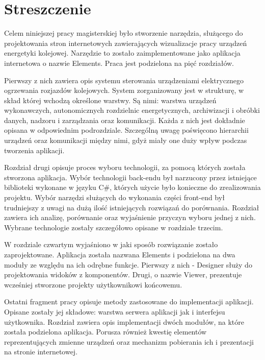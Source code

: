 \chapter*{Streszczenie}

Celem niniejszej pracy magisterskiej było stworzenie narzędzia, służącego do projektowania stron internetowych zawierających wizualizacje pracy urządzeń energetyki kolejowej. Narzędzie to zostało zaimplementowane jako aplikacja internetowa o nazwie Elements. Praca jest podzielona na pięć rozdziałów.

Pierwszy z nich zawiera opis systemu sterowania urządzeniami elektrycznego ogrzewania rozjazdów kolejowych. System zorganizowany jest w strukturę, w skład której wchodzą określone warstwy. Są nimi: warstwa urządzeń wykonawczych, autonomicznych rozdzielnic energetycznych, archiwizacji i obróbki danych, nadzoru i zarządzania oraz komunikacji. Każda z nich jest dokładnie opisana w odpowiednim podrozdziale. Szczególną uwagę poświęcono hierarchii urządzeń oraz komunikacji między nimi, gdyż miały one duży wpływ podczas tworzenia aplikacji.

Rozdział drugi opisuje proces wyboru technologii, za pomocą których została stworzona aplikacja. Wybór technologii back-endu był narzucony przez istniejące biblioteki wykonane w języku C\#, których użycie było konieczne do zrealizowania projektu. Wybór narzędzi służących do wykonania części front-end był trudniejszy z uwagi na dużą ilość istniejących rozwiązań do porównania. Rozdział zawiera ich analizę, porównanie oraz wyjaśnienie przyczyn wyboru jednej z nich. Wybrane technologie zostały szczegółowo opisane w rozdziale trzecim.

W rozdziale czwartym wyjaśniono w jaki sposób rozwiązanie zostało zaprojektowane. Aplikacja została nazwana Elements i podzielona na dwa moduły ze względu na ich odrębne funkcje. Pierwszy z nich - Designer służy do projektowania widoków z komponentów. Drugi, o nazwie Viewer, prezentuje wcześniej stworzone projekty użytkownikowi końcowemu.

Ostatni fragment pracy opisuje metody zastosowane do implementacji aplikacji. Opisane zostały jej składowe: warstwa serwera aplikacji jak i interfejsu użytkownika. Rozdział zawiera opis implementacji dwóch modułów, na które została podzielona aplikacja. Porusza również kwestię elementów reprezentujących zmienne urządzeń oraz mechanizm pobierania ich i prezentacji na stronie internetowej.
